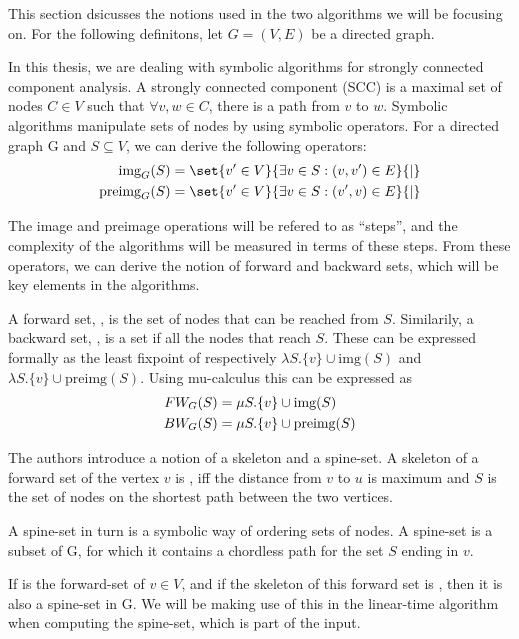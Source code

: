 \documentclass[../master/master.tex]{subfiles}
\begin{document}

This section dsicusses the notions used in the two algorithms we will be focusing on. For the following definitons, let $G=(V,E)$ be a directed graph.

In this thesis, we are dealing with symbolic algorithms for strongly connected component analysis. A strongly connected component (SCC) is a maximal set of nodes $C\in V$ such that $\forall v,w\in C$, there is a path from $v$ to $w$. Symbolic algorithms manipulate sets of nodes by using symbolic operators. For a directed graph G and $S\subseteq V$, we can derive the following operators: 
\begin{align*}
\img S &= \set{v' \in V}{\exists v\in S:(v, v')\in E}{|}\\
\pre S &= \set{v' \in V}{\exists v\in S:(v', v)\in E}{|}
\end{align*}

The image and preimage operations will be refered to as ``steps'', and the complexity of the algorithms will be measured in terms of these steps.
From these operators, we can derive the notion of forward and backward sets, which will be key elements in the algorithms.

A forward set, , is the set of nodes that can be reached from $S$. Similarily, a backward set, , is a set if all the nodes that reach $S$. These can be expressed formally as the least fixpoint of respectively $\lambda S.\{v\}\cup \text{img}(S)$ and $\lambda S.\{v\}\cup \text{preimg}(S)$. Using mu-calculus \cite{clarke_peled_grumberg_1999} this can be expressed as 
\begin{align}\label{fw}
FW_{G}(S) &= \mu S.\{v\}\cup \text{img}(S)\\
\label{bw}BW_{G}(S) &= \mu S.\{v\}\cup \text{preimg}(S)
\end{align}

The authors \cite{linear} introduce a notion of a skeleton and a spine-set. A skeleton of a forward set of the vertex $v$  is , iff the distance from $v$ to $u$ is maximum and $S$ is the set of nodes on the shortest path between the two vertices.

A spine-set in turn is a symbolic way of ordering sets of nodes. A spine-set is a subset  of G, for which it contains a chordless path for the set $S$ ending in $v$.

If  is the forward-set of $v \in V$, and if the skeleton of this forward set is , then it is also a spine-set in G. We will be making use of this in the linear-time algorithm when computing the spine-set, which is part of the input. 
\end{document}
